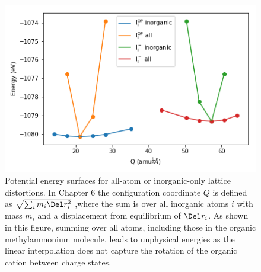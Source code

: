 \begin{figure}[h!]   %
\centering
  \includegraphics[width=0.7\columnwidth]{figures/ap9/organic_inorganic.png}
  \caption[Potential energy surfaces for all-atom or inorganic-only lattice distortions]{Potential energy surfaces for all-atom or inorganic-only lattice distortions. In Chapter 6 the configuration coordinate $Q$ is defined as $\sqrt{\sum_i m_i \Del r_i^2}$ ,where the sum is over all inorganic atoms $i$ with mass $m_i$ and a displacement from equilibrium of $\Del r_i$. As shown in this figure, summing over all atoms, including those in the organic methylammonium molecule, leads to unphysical energies as the linear interpolation does not capture the rotation of the organic cation between charge states.}
\label{schrodinger}
\end{figure}
